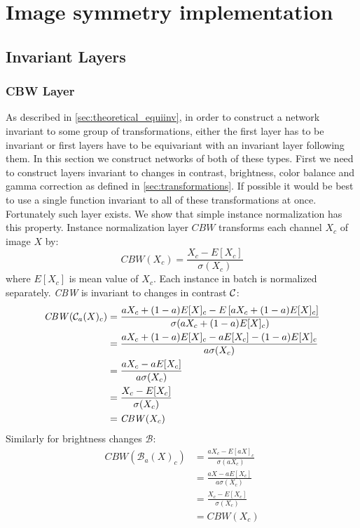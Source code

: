 \section{Image symmetry implementation}
\newcommand\cbw{\mathit{CBW}}
\newcommand\gbw{\mathit{GBW}}

\subsection{Invariant Layers}
\subsubsection{CBW Layer}
As described in \ref{sec:theoretical_equiinv}, in order to construct a network
invariant to some group of transformations, either the first layer has to be
invariant or first layers have to be equivariant with an invariant layer
following them. In this section we construct networks of both of these types.
First we need to construct layers invariant to changes in
contrast, brightness, color balance and gamma correction as defined in
\ref{sec:transformations}. If possible it would be best to use a single function
invariant to all of these transformations at once. Fortunately such layer
exists. We show that simple instance normalization has this property.
Instance normalization layer $\mathit{CBW}$ transforms each channel
$X_c$ of image $X$ by:
$$ \mathit{CBW}(X_c) = \frac{X_c-E[X_c]}{\sigma(X_c)} $$
where $E[X_c]$ is mean value of $X_c$.
Each instance in batch is normalized separately.
\textit{CBW} is invariant to changes in contrast $\mathcal{C}$:
\begin{align*}
    \mathit{CBW}(\mathcal{C}_a(X)_c) &=
    \frac{aX_c+(1-a)E[X]_c - E\left[aX_c+(1-a)E[X]_c\right]}{\sigma(aX_c+(1-a)E[X]_c)} \\
    &= \frac{aX_c+(1-a)E[X]_c - aE[X_c]-(1-a)E[X]_c}{a\sigma(X_c)} \\
    &= \frac{aX_c-aE[X_c]}{a\sigma(X_c)} \\
    &= \frac{X_c-E[X_c]}{\sigma(X_c)} \\
    &= \mathit{CBW}(X_c)
\end{align*}
Similarly for brightness changes $\mathcal{B}$:
\begin{align*}
    \mathit{CBW}(\mathcal{B}_a(X)_c) &=
    \frac{aX_c - E\left[aX\right]_c}{\sigma(aX_c)} \\
    &= \frac{aX-aE[X_c]}{a\sigma(X_c)} \\
    &= \frac{X_c-E[X_c]}{\sigma(X_c)} \\
    &= \mathit{CBW}(X_c)
\end{align*}
